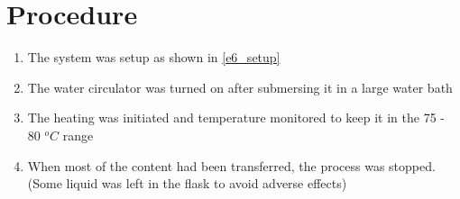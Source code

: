 \section{Procedure}	
	\begin{enumerate}
		\item The system was setup as shown in \autoref{e6_setup}
		\item The water circulator was turned on after submersing it in a large water bath
		\item The heating was initiated and temperature monitored to keep it in the 75 - 80 $^o C$ range
		\item When most of the content had been transferred, the process was stopped. (Some liquid was left in the flask to avoid adverse effects)
	\end{enumerate}

